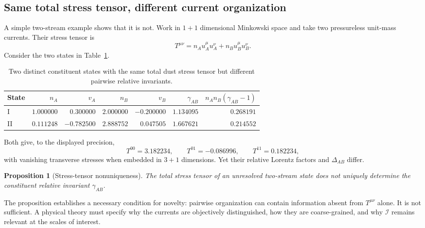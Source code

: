 \documentclass[11pt]{article}
\newtheorem{proposition}[definition]{Proposition}
\begin{document}
\subsection{Same total stress tensor, different current organization}

A simple two-stream example shows that it is not.  Work in $1+1$ dimensional Minkowski space and take two pressureless unit-mass currents.  Their stress tensor is
\begin{equation}
T^{\mu\nu}
=n_Au_A^\mu u_A^\nu+n_Bu_B^\mu u_B^\nu.
\label{eq:dustT}
\end{equation}
Consider the two states in Table~\ref{tab:degenerateStates}.

\begin{table}[ht]
\centering
\begin{tabular}{@{}lrrrrrr@{}}
\toprule
State & $n_A$ & $v_A$ & $n_B$ & $v_B$ & $\gamma_{AB}$ & $n_An_B(\gamma_{AB}-1)$\\
\midrule
I & $1.000000$ & $0.300000$ & $2.000000$ & $-0.200000$ & $1.134095$ & $0.268191$\\
II & $0.111248$ & $-0.782500$ & $2.888752$ & $0.047505$ & $1.667621$ & $0.214552$\\
\bottomrule
\end{tabular}
\caption{Two distinct constituent states with the same total dust stress tensor but different pairwise relative invariants.}
\label{tab:degenerateStates}
\end{table}
Both give, to the displayed precision,
\begin{equation}
T^{00}=3.182234,
\qquad
T^{01}=-0.086996,
\qquad
T^{11}=0.182234,
\label{eq:sameT}
\end{equation}
with vanishing transverse stresses when embedded in $3+1$ dimensions.  Yet their relative Lorentz factors and $\Delta_{AB}$ differ.

\begin{proposition}[Stress-tensor nonuniqueness]
The total stress tensor of an unresolved two-stream state does not uniquely determine the constituent relative invariant $\gamma_{AB}$.
\end{proposition}

\noindent
The proposition establishes a necessary condition for novelty: pairwise organization can contain information absent from $T^{\mu\nu}$ alone.  It is not sufficient.  A physical theory must specify why the currents are objectively distinguished, how they are coarse-grained, and why $\mathcal I$ remains relevant at the scales of interest.
\end{document}
